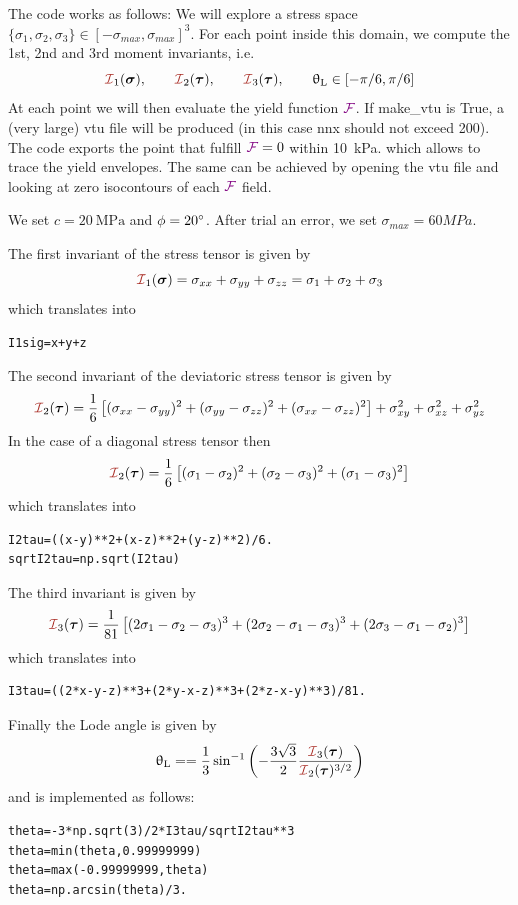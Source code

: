 The code works as follows: We will explore a stress 
space $\{\sigma_1,\sigma_2,\sigma_3\}\in[-\sigma_{max},\sigma_{max}]^3$.
For each point inside this domain, we compute the 1st, 2nd and 3rd moment invariants, i.e.
\[
\III_1({\bm \sigma}), 
\qquad \III_2({\bm \tau}), 
\qquad \III_3({\bm \tau}), 
\qquad \uptheta_{\rm L}\in[-\pi/6,\pi/6]
\] 
At each point we will then evaluate the yield function ${\color{violet}\cal F}$. 
If {\python make\_vtu} is True, a (very large) vtu file will be produced (in this 
case nnx should not exceed 200).
The code exports the point that fulfill ${\color{violet}\cal F}=0$ within 10~\si{\kilo\pascal}. 
which allows to trace the yield envelopes.
The same can be achieved by opening the vtu file and looking at zero isocontours of each ${\color{violet}\cal F}$ field.

We set $c=20~\si{\mega\pascal}$ and $\phi=20\degree$. After trial an error, we set $\sigma_{max}=60MPa$.

The first invariant of the stress tensor is given by 
\[
\III_1({\bm\sigma})=\sigma_{xx}+\sigma_{yy}+\sigma_{zz} = \sigma_1+\sigma_2+\sigma_3
\]
which translates into
\begin{lstlisting}
I1sig=x+y+z
\end{lstlisting}
The second invariant of the deviatoric stress tensor is given by 
\[
\III_2({\bm \tau})  
=\frac{1}{6}\left[(\sigma_{xx}-\sigma_{yy})^2 + (\sigma_{yy}-\sigma_{zz})^2 + (\sigma_{xx}-\sigma_{zz})^2 \right]  
+ \sigma_{xy}^2 + \sigma_{xz}^2 + \sigma_{yz}^2 
\]
In the case of a diagonal stress tensor then
\[
\III_2({\bm \tau})  
=\frac{1}{6}\left[(\sigma_{1}-\sigma_{2})^2 + (\sigma_{2}-\sigma_{3})^2 + (\sigma_{1}-\sigma_{3})^2 \right]  
\]
which translates into
\begin{lstlisting}
I2tau=((x-y)**2+(x-z)**2+(y-z)**2)/6.
sqrtI2tau=np.sqrt(I2tau)
\end{lstlisting}

The third invariant is given by
\[
\III_3(\bm \tau)
= \frac{1}{81}
\left[
(2\sigma_1-\sigma_2-\sigma_3)^3+
(2\sigma_2-\sigma_1-\sigma_3)^3+
(2\sigma_3-\sigma_1-\sigma_2)^3
\right] 
\]
which translates into
\begin{lstlisting}
I3tau=((2*x-y-z)**3+(2*y-x-z)**3+(2*z-x-y)**3)/81.
\end{lstlisting}

Finally the Lode angle is given by
\[
\uptheta_{\rm L} = 
=\frac{1}{3} \sin^{-1} 
\left( -\frac{3\sqrt{3}}{2} \frac{{\III}_3({\bm \tau})}{{\III}_2({\bm \tau})^{3/2}} \right)
\]
and is implemented as follows:
\begin{lstlisting}
theta=-3*np.sqrt(3)/2*I3tau/sqrtI2tau**3
theta=min(theta,0.99999999)
theta=max(-0.99999999,theta)
theta=np.arcsin(theta)/3.
\end{lstlisting}

